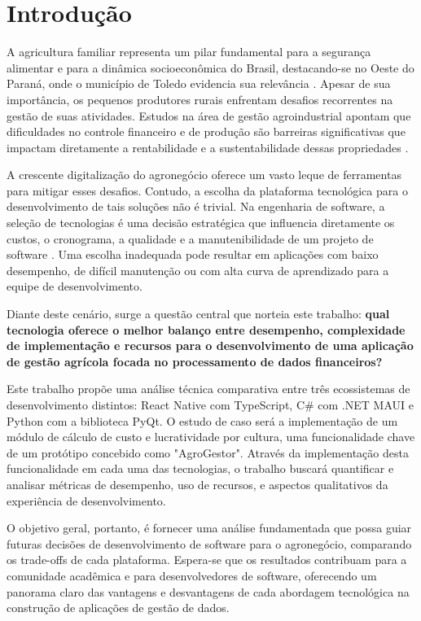 
\chapter{Introdução}
\label{cha:introducao}

A agricultura familiar representa um pilar fundamental para a segurança alimentar e para a dinâmica socioeconômica do Brasil, destacando-se no Oeste do Paraná, onde o município de Toledo evidencia sua relevância \cite{ibge_censo2017}. Apesar de sua importância, os pequenos produtores rurais enfrentam desafios recorrentes na gestão de suas atividades. Estudos na área de gestão agroindustrial apontam que dificuldades no controle financeiro e de produção são barreiras significativas que impactam diretamente a rentabilidade e a sustentabilidade dessas propriedades \cite{batalha2007gestaoAgroindustrial}.

A crescente digitalização do agronegócio oferece um vasto leque de ferramentas para mitigar esses desafios. Contudo, a escolha da plataforma tecnológica para o desenvolvimento de tais soluções não é trivial. Na engenharia de software, a seleção de tecnologias é uma decisão estratégica que influencia diretamente os custos, o cronograma, a qualidade e a manutenibilidade de um projeto de software \cite{pressman2014engenhariaSoftware}. Uma escolha inadequada pode resultar em aplicações com baixo desempenho, de difícil manutenção ou com alta curva de aprendizado para a equipe de desenvolvimento.

Diante deste cenário, surge a questão central que norteia este trabalho: \textbf{qual tecnologia oferece o melhor balanço entre desempenho, complexidade de implementação e recursos para o desenvolvimento de uma aplicação de gestão agrícola focada no processamento de dados financeiros?} 

Este trabalho propõe uma análise técnica comparativa entre três ecossistemas de desenvolvimento distintos: React Native com TypeScript, C\# com .NET MAUI e Python com a biblioteca PyQt. O estudo de caso será a implementação de um módulo de cálculo de custo e lucratividade por cultura, uma funcionalidade chave de um protótipo concebido como "AgroGestor". Através da implementação desta funcionalidade em cada uma das tecnologias, o trabalho buscará quantificar e analisar métricas de desempenho, uso de recursos, e aspectos qualitativos da experiência de desenvolvimento.

O objetivo geral, portanto, é fornecer uma análise fundamentada que possa guiar futuras decisões de desenvolvimento de software para o agronegócio, comparando os trade-offs de cada plataforma. Espera-se que os resultados contribuam para a comunidade acadêmica e para desenvolvedores de software, oferecendo um panorama claro das vantagens e desvantagens de cada abordagem tecnológica na construção de aplicações de gestão de dados.
